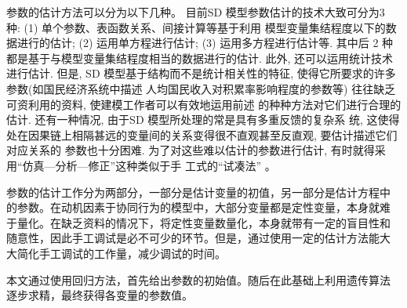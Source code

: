 参数的估计方法可以分为以下几种。
目前SD 模型参数估计的技术大致可分为3 种: (1) 单个参数、表函数关系、间接计算等基于利用
模型变量集结程度以下的数据进行的估计; (2) 运用单方程进行估计; (3) 运用多方程进行估计等. 其中后
2 种都是基于与模型变量集结程度相当的数据进行的估计. 此外, 还可以运用统计技术进行估计.
但是, SD 模型基于结构而不是统计相关性的特征, 使得它所要求的许多参数(如国民经济系统中描述
人均国民收入对积累率影响程度的参数等) 往往缺乏可资利用的资料, 使建模工作者可以有效地运用前述
的种种方法对它们进行合理的估计. 还有一种情况, 由于SD 模型所处理的常是具有多重反馈的复杂系
统, 这使得处在因果链上相隔甚远的变量间的关系变得很不直观甚至反直观, 要估计描述它们对应关系的
参数也十分困难. 为了对这些难以估计的参数进行估计, 有时就得采用“仿真—分析—修正”这种类似于手
工式的“试凑法'' \cite{linwenhao2002}。

参数的估计工作分为两部分，一部分是估计变量的初值，另一部分是估计方程中
的参数。在动机因素于协同行为的模型中，大部分变量都是定性变量，本身就难
于量化。在缺乏资料的情况下，将定性变量数量化，本身就带有一定的盲目性和
随意性，因此手工调试是必不可少的环节。但是，通过使用一定的估计方法能大
大简化手工调试的工作量，减少调试的时间。

本文通过使用回归方法，首先给出参数的初始值。随后在此基础上利用遗传算法
逐步求精\cite{linwenhao2002}，最终获得各变量的参数值。

